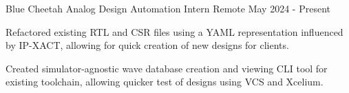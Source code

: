   \cventry
    {Blue Cheetah Analog} %
    {Design Automation Intern} %
    {Remote} %
    {May 2024 - Present} %
    {
      \begin{cvitems} %
        \item {
        Refactored existing RTL and CSR files using a YAML representation influenced by IP-XACT, allowing for quick creation of new designs for clients.
        }
        \item {
        Created simulator-agnostic wave database creation and viewing CLI tool for existing toolchain, allowing quicker test of designs using VCS and Xcelium.
        }
      \end{cvitems}
    }
